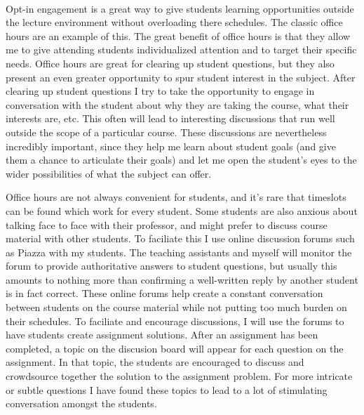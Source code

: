 \documentclass{article}
\begin{document}
\paragraph{} Opt-in engagement is a great way to give students learning opportunities outside the lecture environment without overloading there schedules. The classic office hours are an example of this. The great benefit of office hours is that they allow me to give attending students individualized attention and to target their specific needs. Office hours are great for clearing up student questions, but they also present an even greater opportunity to spur student interest in the subject. After clearing up student questions I try to take the opportunity to engage in conversation with the student about why they are taking the course, what their interests are, etc. This often will lead to interesting discussions that run well outside the scope of a particular course. These discussions are nevertheless incredibly important, since they help me learn about student goals (and give them a chance to articulate their goals) and let me open the student's eyes to the wider possibilities of what the subject can offer.

Office hours are not always convenient for students, and it's rare that timeslots can be found which work for every student. Some students are also anxious about talking face to face with their professor, and might prefer to discuss course material with other students. To faciliate this I use online discussion forums such as Piazza with my students. The teaching assistants and myself will monitor the forum to provide authoritative answers to student questions, but usually this amounts to nothing more than confirming a well-written reply by another student is in fact correct. These online forums help create a constant conversation between students on the course material while not putting too much burden on their schedules. To faciliate and encourage discussions, I will use the forums to have students create assignment solutions. After an assignment has been completed, a topic on the discusion board will appear for each question on the assignment. In that topic, the students are encouraged to discuss and crowdsource together the solution to the assignment problem. For more intricate or subtle questions I have found these topics to lead to a lot of stimulating conversation amongst the students.


\paragraph{}
\end{document}
